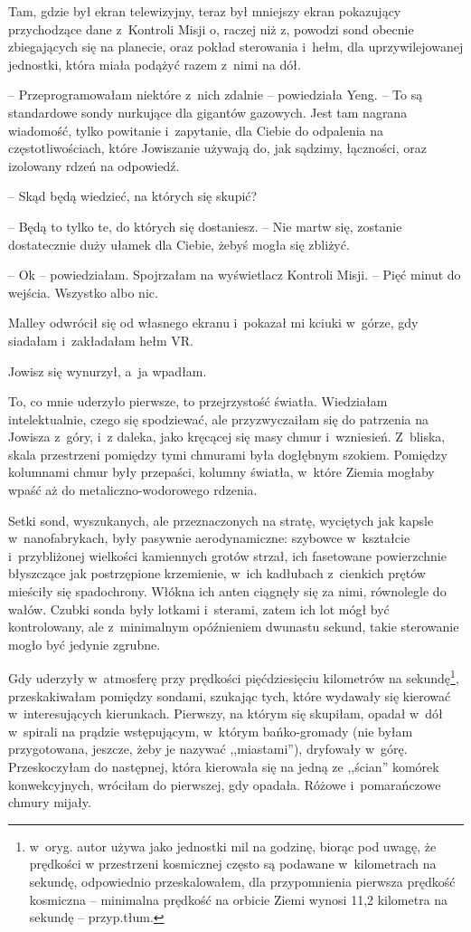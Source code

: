 \documentclass[oneside,polish,11pt,sfheadings]{mwbk}
\begin{document}
Tam, gdzie był ekran telewizyjny, teraz był mniejszy ekran pokazujący
przychodzące dane z~Kontroli Misji o, raczej niż z, powodzi sond obecnie
zbiegających się na planecie, oraz pokład sterowania i~hełm, dla
uprzywilejowanej jednostki, która miała podążyć razem z~nimi na dół.

-- Przeprogramowałam niektóre z~nich zdalnie -- powiedziała Yeng. -- To są
standardowe sondy nurkujące dla gigantów gazowych. Jest tam nagrana
wiadomość, tylko powitanie i~zapytanie, dla Ciebie do odpalenia na
częstotliwościach, które Jowiszanie używają do, jak sądzimy, łączności,
oraz izolowany rdzeń na odpowiedź.

-- Skąd będą wiedzieć, na których się skupić?

-- Będą to tylko te, do których się dostaniesz. -- Nie martw się, zostanie
dostatecznie duży ułamek dla Ciebie, żebyś mogła się zbliżyć.

-- Ok -- powiedziałam. Spojrzałam na wyświetlacz Kontroli Misji. -- Pięć
minut do wejścia. Wszystko albo nic.

Malley odwrócił się od własnego ekranu i~pokazał mi kciuki w~górze, gdy
siadałam i~zakładałam hełm VR.

Jowisz się wynurzył, a~ja wpadłam.

To, co mnie uderzyło pierwsze, to przejrzystość światła. Wiedziałam
intelektualnie, czego się spodziewać, ale przyzwyczaiłam się do
patrzenia na Jowisza z~góry, i~z daleka, jako kręcącej się masy chmur i~wzniesień. Z~bliska, skala przestrzeni pomiędzy tymi chmurami była
dogłębnym szokiem. Pomiędzy kolumnami chmur były przepaści, kolumny
światła, w~które Ziemia mogłaby wpaść aż do metaliczno-wodorowego
rdzenia.

Setki sond, wyszukanych, ale przeznaczonych na stratę, wyciętych jak
kapsle w~nanofabrykach, były pasywnie aerodynamiczne: szybowce w~kształcie i~przybliżonej wielkości kamiennych grotów strzał, ich
fasetowane powierzchnie błyszczące jak postrzępione krzemienie, w~ich
kadłubach z~cienkich prętów mieściły się spadochrony. Włókna ich anten
ciągnęły się za nimi, równolegle do wałów. Czubki sonda były lotkami i~sterami, zatem ich lot mógł być kontrolowany, ale z~minimalnym
opóźnieniem dwunastu sekund, takie sterowanie mogło być jedynie zgrubne.

Gdy uderzyły w~atmosferę przy prędkości pięćdziesięciu kilometrów na
sekundę\footnote{ w~oryg. autor używa jako jednostki mil na godzinę, biorąc pod uwagę, że prędkości w przestrzeni kosmicznej często są podawane w~kilometrach na sekundę,
odpowiednio przeskalowałem, dla przypomnienia pierwsza prędkość
kosmiczna -- minimalna prędkość na orbicie Ziemi wynosi 11,2 kilometra na
sekundę -- przyp.tłum.}, przeskakiwałam pomiędzy sondami, szukając tych,
które wydawały się kierować w~interesujących kierunkach. Pierwszy, na
którym się skupiłam, opadał w~dół w~spirali na prądzie wstępującym, w~którym bańko-gromady (nie byłam przygotowana, jeszcze, żeby je nazywać
,,miastami''), dryfowały w~górę. Przeskoczyłam do następnej, która
kierowała się na jedną ze ,,ścian'' komórek konwekcyjnych, wróciłam do
pierwszej, gdy opadała. Różowe i~pomarańczowe chmury mijały.
\end{document}
